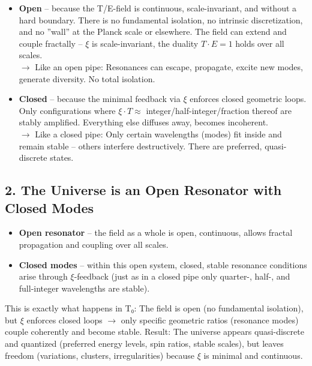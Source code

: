 	\begin{itemize}[label=$\bullet$]
		\item \textbf{Open} – because the T/E-field is continuous, scale-invariant, and without a hard boundary. There is no fundamental isolation, no intrinsic discretization, and no ''wall'' at the Planck scale or elsewhere. The field can extend and couple fractally – $\xi$ is scale-invariant, the duality $T \cdot E = 1$ holds over all scales. \\
		$\rightarrow$ Like an open pipe: Resonances can escape, propagate, excite new modes, generate diversity. No total isolation.
		
		\item \textbf{Closed} – because the minimal feedback via $\xi$ enforces closed geometric loops. Only configurations where $\xi \cdot T \approx$ integer/half-integer/fraction thereof are stably amplified. Everything else diffuses away, becomes incoherent. \\
		$\rightarrow$ Like a closed pipe: Only certain wavelengths (modes) fit inside and remain stable – others interfere destructively. There are preferred, quasi-discrete states.
	\end{itemize}
	
	\subsection*{2. The Universe is an Open Resonator with Closed Modes}
	
	\begin{itemize}[label=$\bullet$]
		\item \textbf{Open resonator} – the field as a whole is open, continuous, allows fractal propagation and coupling over all scales.
		\item \textbf{Closed modes} – within this open system, closed, stable resonance conditions arise through $\xi$-feedback (just as in a closed pipe only quarter-, half-, and full-integer wavelengths are stable).
	\end{itemize}
	
	This is exactly what happens in T₀: The field is open (no fundamental isolation), but $\xi$ enforces closed loops $\rightarrow$ only specific geometric ratios (resonance modes) couple coherently and become stable. Result: The universe appears quasi-discrete and quantized (preferred energy levels, spin ratios, stable scales), but leaves freedom (variations, clusters, irregularities) because $\xi$ is minimal and continuous.
	
